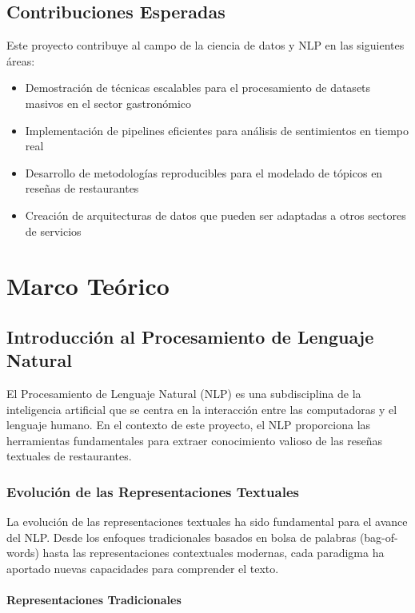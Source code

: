\documentclass[12pt,a4paper,twoside,openany]{book}
\begin{document}
\section{Contribuciones Esperadas}

Este proyecto contribuye al campo de la ciencia de datos y NLP en las siguientes áreas:

\begin{itemize}
    \item Demostración de técnicas escalables para el procesamiento de datasets masivos en el sector gastronómico
    \item Implementación de pipelines eficientes para análisis de sentimientos en tiempo real
    \item Desarrollo de metodologías reproducibles para el modelado de tópicos en reseñas de restaurantes
    \item Creación de arquitecturas de datos que pueden ser adaptadas a otros sectores de servicios
\end{itemize}

\chapter{Marco Teórico}

\section{Introducción al Procesamiento de Lenguaje Natural}

El Procesamiento de Lenguaje Natural (NLP) es una subdisciplina de la inteligencia artificial que se centra en la interacción entre las computadoras y el lenguaje humano. En el contexto de este proyecto, el NLP proporciona las herramientas fundamentales para extraer conocimiento valioso de las reseñas textuales de restaurantes.

\subsection{Evolución de las Representaciones Textuales}

La evolución de las representaciones textuales ha sido fundamental para el avance del NLP. Desde los enfoques tradicionales basados en bolsa de palabras (bag-of-words) hasta las representaciones contextuales modernas, cada paradigma ha aportado nuevas capacidades para comprender el texto.

\subsubsection{Representaciones Tradicionales}
\end{document}
